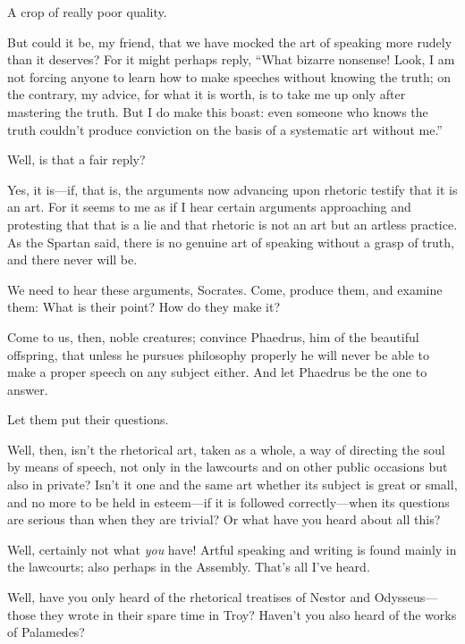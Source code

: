 \sayphaedrus A crop of really poor quality.

\saysocrates But could it be, my friend, that we have mocked the art of
speaking more rudely than it deserves? For it might perhaps reply, “What
bizarre nonsense! Look, I am not forcing anyone to learn how to make
speeches without knowing the truth; on the contrary, my advice, for what
it is worth, is to take me up only after mastering the truth. But I do
make this boast: even someone who knows the truth couldn't produce
conviction on the basis of a systematic art without me.”

\sayphaedrus Well, is that a fair reply?

\saysocrates Yes, it is---if, that is, the arguments now advancing upon
rhetoric testify that it is an art. For it seems to me as if I hear
certain arguments approaching and protesting that that is a lie and that
rhetoric is not an art but an artless
practice. As the
Spartan said, there is no genuine art of speaking without a grasp of
truth, and there never will be.

\sayphaedrus We need to hear these arguments, Socrates. Come, produce
them, and examine them: What is their point? How do they
make it?

\saysocrates Come to us, then, noble creatures; convince Phaedrus, him of
the beautiful
offspring, that unless
he pursues philosophy properly he will never be able to make a proper
speech on any subject either. And let Phaedrus be the one to answer.

\sayphaedrus Let them put their questions.

\saysocrates Well, then, isn't the rhetorical art, taken as a whole, a way
of directing the soul by means of speech, not only in the lawcourts and
on other public occasions but also in private? Isn't it one and the same
art whether its subject is great or small, and no more to be held in
esteem---if it is followed correctly---when its questions are
serious than when they are trivial? Or what have you heard about all
this?

\sayphaedrus Well, certainly not what {\em you} have! Artful speaking and
writing is found mainly in the lawcourts; also perhaps in the Assembly.
That's all I've heard.

\saysocrates Well, have you only heard of the rhetorical treatises of
Nestor and Odysseus---those they wrote in their spare time in Troy?
Haven't you also heard of the works of
Palamedes?


